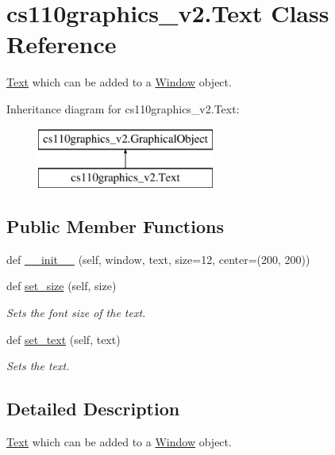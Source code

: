\hypertarget{classcs110graphics__v2_1_1Text}{}\section{cs110graphics\+\_\+v2.\+Text Class Reference}
\label{classcs110graphics__v2_1_1Text}


\mbox{\hyperlink{classcs110graphics__v2_1_1Text}{Text}} which can be added to a \mbox{\hyperlink{classcs110graphics__v2_1_1Window}{Window}} object.  


Inheritance diagram for cs110graphics\+\_\+v2.\+Text\+:\begin{figure}[H]
\begin{center}
\leavevmode
\includegraphics[height=2.000000cm]{classcs110graphics__v2_1_1Text}
\end{center}
\end{figure}
\subsection*{Public Member Functions}
\begin{DoxyCompactItemize}
\item 
def \mbox{\hyperlink{classcs110graphics__v2_1_1Text_a642c850d7315ca9831ba6967674271b3}{\+\_\+\+\_\+init\+\_\+\+\_\+}} (self, window, text, size=12, center=(200, 200))
\item 
def \mbox{\hyperlink{classcs110graphics__v2_1_1Text_ab949ee38bfb435c8aed48e58186b2c01}{set\+\_\+size}} (self, size)
\begin{DoxyCompactList}\small\item\em Sets the font size of the text. \end{DoxyCompactList}\item 
def \mbox{\hyperlink{classcs110graphics__v2_1_1Text_ac3a40d1edd6f17ab57a372b193a4e70f}{set\+\_\+text}} (self, text)
\begin{DoxyCompactList}\small\item\em Sets the text. \end{DoxyCompactList}\end{DoxyCompactItemize}


\subsection{Detailed Description}
\mbox{\hyperlink{classcs110graphics__v2_1_1Text}{Text}} which can be added to a \mbox{\hyperlink{classcs110graphics__v2_1_1Window}{Window}} object. 




